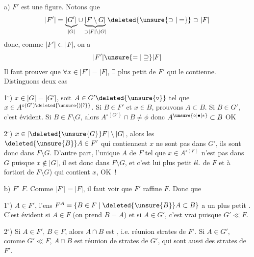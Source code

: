 a) $F'$ est une figure.  Notons que 
\[
 |F'|=\underbrace{|G'|}_{|G|}\cup\underbrace{|F\setminus G|}_{\supset |F|\setminus |G|}\deleted{\unsure{\supset|=}}\supset |F|
\]
donc, comme $|F'|\subset |F|$, on a
\[
 |F'|\unsure{=|\supseteq}|F|
\]
Il faut prouver que $\forall x\in |F'|=|F|$, $\exists$ plus petit  de $F'$ qui le contienne. Distinguons deux cas

1$^\circ$) $x\in |G|=|G'|$, soit $A\in G'\deleted{\unsure{\circ}}$ tel que $x\in A^{\circ(G')\deleted{\unsure{)|?}}}$. Si $B\in F'$ et  $x\in B$, prouvons $A\subset B$. Si $B\in G'$, c'est évident. Si $B\in F\setminus G$, alors  $A^{\circ(G')}\cap B\ne\phi$ donc $A^{\unsure{\circ|\bullet|*}}\subset B$ OK

2$^\circ$) $x\in |\deleted{\unsure{G}}F|\setminus |G|$, alors les $\deleted{\unsure{B}}A\in F'$ qui contiennent $x$ ne sont pas dans $G'$, ils sont donc dans $F\setminus G$. D'autre part, l'unique  $A$ de $F$ tel que $x\in A^{\circ(F)}$ n'est pas dans $G$ puisque $x\notin |G|$, il est donc dans $F\setminus G$, et  c'est lui plus petit él. de $F$ et à fortiori de $F\setminus G$) qui contient $x$, OK~!

b) $F'$  $F$. Comme $|F'|=|F|$, il faut voir  que $F'$ raffine $F$. Donc  que

1$^\circ$) \deleted{$\forall$} $A\in F'$, l'ens $F^A=\{B\in F\mid \deleted{\unsure{B}}A\subset B\}$ a un plus petit . C'est évident si $A\in F$  (on prend $B=A$) et si $A\in G'$, c'est vrai puisque $G'\ll F$.

2$^\circ$) Si $A\in F'$, $B\in F$, alors $A\cap B$ est , i.e. réunion  strates de $F'$. Si $A\in G'$, comme $G'\ll F$, $A\cap B$ est réunion de strates de $G'$, qui sont aussi des strates de $F'$.
